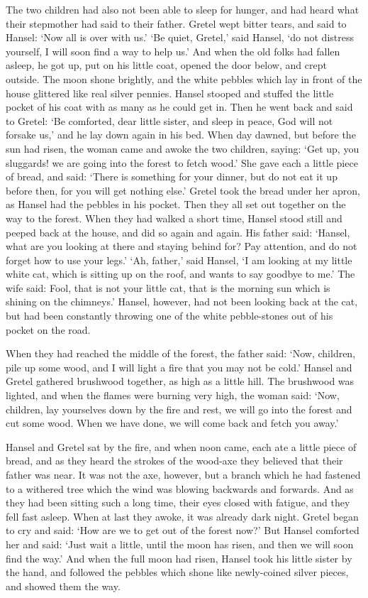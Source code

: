 \documentclass[oneside,10pt]{memoir} %
\begin{document}
The two children had also not been able to sleep for hunger, and had heard what their stepmother had said to their father. Gretel wept bitter tears, and said to Hansel: `Now all is over with us.' `Be quiet, Gretel,' said Hansel, `do not distress yourself, I will soon find a way to help us.' And when the old folks had fallen asleep, he got up, put on his little coat, opened the door below, and crept outside. The moon shone brightly, and the white pebbles which lay in front of the house glittered like real silver pennies. Hansel stooped and stuffed the little pocket of his coat with as many as he could get in. Then he went back and said to Gretel: `Be comforted, dear little sister, and sleep in peace, God will not forsake us,' and he lay down again in his bed. When day dawned, but before the sun had risen, the woman came and awoke the two children, saying: `Get up, you sluggards! we are going into the forest to fetch wood.' She gave each a little piece of bread, and said: `There is something for your dinner, but do not eat it up before then, for you will get nothing else.' Gretel took the bread under her apron, as Hansel had the pebbles in his pocket. Then they all set out together on the way to the forest. When they had walked a short time, Hansel stood still and peeped back at the house, and did so again and again. His father said: `Hansel, what are you looking at there and staying behind for? Pay attention, and do not forget how to use your legs.' `Ah, father,' said Hansel, `I am looking at my little white cat, which is sitting up on the roof, and wants to say goodbye to me.' The wife said: Fool, that is not your little cat, that is the morning sun which is shining on the chimneys.' Hansel, however, had not been looking back at the cat, but had been constantly throwing one of the white pebble-stones out of his pocket on the road.

When they had reached the middle of the forest, the father said: `Now, children, pile up some wood, and I will light a fire that you may not be cold.' Hansel and Gretel gathered brushwood together, as high as a little hill. The brushwood was lighted, and when the flames were burning very high, the woman said: `Now, children, lay yourselves down by the fire and rest, we will go into the forest and cut some wood. When we have done, we will come back and fetch you away.'

Hansel and Gretel sat by the fire, and when noon came, each ate a little piece of bread, and as they heard the strokes of the wood-axe they believed that their father was near. It was not the axe, however, but a branch which he had fastened to a withered tree which the wind was blowing backwards and forwards. And as they had been sitting such a long time, their eyes closed with fatigue, and they fell fast asleep. When at last they awoke, it was already dark night. Gretel began to cry and said: `How are we to get out of the forest now?' But Hansel comforted her and said: `Just wait a little, until the moon has risen, and then we will soon find the way.' And when the full moon had risen, Hansel took his little sister by the hand, and followed the pebbles which shone like newly-coined silver pieces, and showed them the way.
\end{document}
